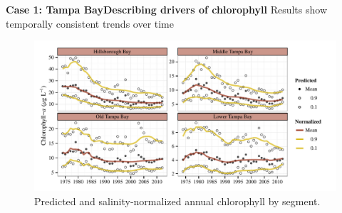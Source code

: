 \documentclass[serif]{beamer}\usepackage[]{graphicx}\usepackage[]{color}
\begin{document}
\begin{frame}{\textbf{Case 1: Tampa Bay}}{\textbf{Describing drivers of chlorophyll}}
Results show temporally consistent trends over time
\begin{figure}
\centerline{\includegraphics[width = \textwidth]{fig/prdnrm.pdf}}
\caption{Predicted and salinity-normalized annual chlorophyll by segment.}
\end{figure}
\end{frame}




\end{document}
